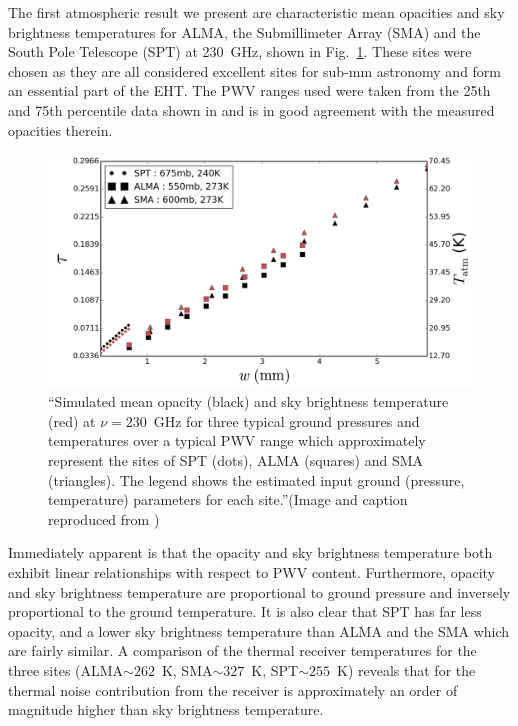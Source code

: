 The first atmospheric result we present are characteristic mean opacities and sky brightness temperatures for ALMA, the Submillimeter Array (SMA) and the South Pole Telescope (SPT) at 230~GHz, shown in Fig.~\ref{fig:mean_atm}. These sites were chosen as they are all considered excellent sites for sub-mm astronomy and form an essential part of the EHT. The PWV ranges used were taken from the 25th and 75th percentile data shown in \citet{Lane_1998} and is in good agreement with the measured opacities therein. %

\begin{figure}[h!]
\includegraphics[width=1.\columnwidth]{Images/opacity}
\caption{``Simulated mean opacity (black) and sky brightness temperature (red) at $\nu =230$~GHz  for three typical ground pressures and temperatures over a typical PWV range \citep{Lane_1998} which approximately represent the sites of SPT (dots), ALMA (squares) and SMA (triangles). The legend shows the estimated input ground (pressure, temperature) parameters for each site.''(Image and caption reproduced from \citet{Blecher_2016})\label{fig:mean_atm}%
}
\end{figure}

Immediately apparent is that the opacity and sky brightness temperature both exhibit linear relationships with respect to PWV content. Furthermore, opacity and sky brightness temperature are proportional to ground pressure and inversely proportional to the ground temperature. It is also clear that SPT has far less opacity, and a lower sky brightness temperature than ALMA and the SMA which are fairly similar. A comparison of the thermal receiver temperatures for the three sites  (ALMA$\sim262$~K,  SMA$\sim327$~K, SPT$\sim 255$~K) reveals that for the thermal noise contribution from the receiver is approximately an order of magnitude higher than sky brightness temperature. 



